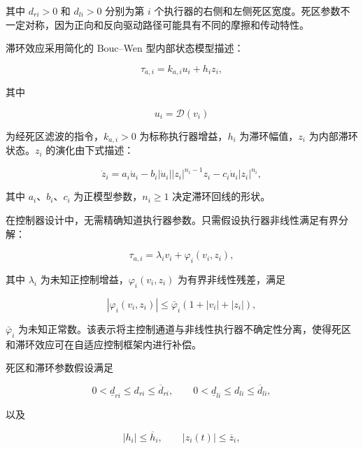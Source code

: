 \documentclass{article}
\begin{document}
其中 $d_{ri}>0$ 和 $d_{li}>0$ 分别为第 $i$ 个执行器的右侧和左侧死区宽度。死区参数不一定对称，因为正向和反向驱动路径可能具有不同的摩擦和传动特性。

滞环效应采用简化的 Bouc–Wen 型内部状态模型描述：

\begin{equation}
\tau_{a,i}=k_{a,i}u_i+h_i z_i, \tag{7}
\end{equation}

其中

\begin{equation*}
u_i=\mathcal{D}(v_i)
\end{equation*}

为经死区滤波的指令，$k_{a,i}>0$ 为标称执行器增益，$h_i$ 为滞环幅值，$z_i$ 为内部滞环状态。$z_i$ 的演化由下式描述：

\begin{equation}
\dot z_i=a_i\dot u_i-b_i|\dot u_i||z_i|^{n_i-1}z_i-c_i\dot u_i|z_i|^{n_i}, \tag{8}
\end{equation}

其中 $a_i$、$b_i$、$c_i$ 为正模型参数，$n_i\geq 1$ 决定滞环回线的形状。

在控制器设计中，无需精确知道执行器参数。只需假设执行器非线性满足有界分解：

\begin{equation}
\tau_{a,i}=\lambda_i v_i+\varphi_i(v_i,z_i), \tag{9}
\end{equation}

其中 $\lambda_i$ 为未知正控制增益，$\varphi_i(v_i,z_i)$ 为有界非线性残差，满足

\begin{equation}
|\varphi_i(v_i,z_i)|\leq\bar\varphi_i\left(1+|v_i|+|z_i|\right), \tag{10}
\end{equation}

$\bar\varphi_i$ 为未知正常数。该表示将主控制通道与非线性执行器不确定性分离，使得死区和滞环效应可在自适应控制框架内进行补偿。

死区和滞环参数假设满足

\begin{equation}
0<\underline d_{ri}\leq d_{ri}\leq\overline d_{ri},\qquad 0<\underline d_{li}\leq d_{li}\leq\overline d_{li}, \tag{11}
\end{equation}

以及

\begin{equation}
|h_i|\leq\overline h_i,\qquad |z_i(t)|\leq\overline z_i, \tag{12}
\end{equation}
\end{document}
